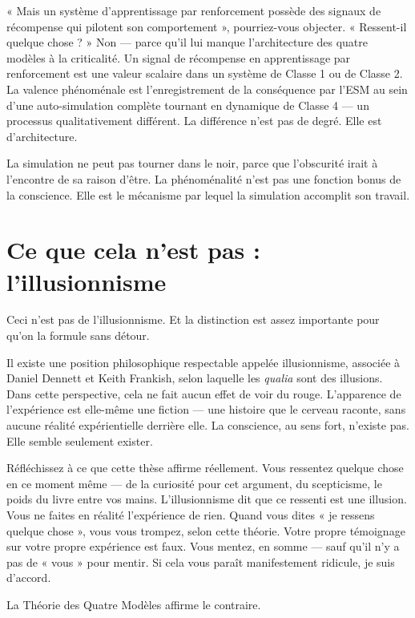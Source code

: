 \documentclass[11pt, twoside, openright]{book}
\begin{document}
« Mais un système d'apprentissage par renforcement possède des signaux de récompense qui pilotent son comportement », pourriez-vous objecter. « Ressent-il quelque chose ? » Non --- parce qu'il lui manque l'architecture des quatre modèles à la criticalité. Un signal de récompense en apprentissage par renforcement est une valeur scalaire dans un système de Classe 1 ou de Classe 2. La valence phénoménale est l'enregistrement de la conséquence par l'ESM au sein d'une auto-simulation complète tournant en dynamique de Classe 4 --- un processus qualitativement différent. La différence n'est pas de degré. Elle est d'architecture.

La simulation ne peut pas tourner dans le noir, parce que l'obscurité irait à l'encontre de sa raison d'être. La phénoménalité n'est pas une fonction bonus de la conscience. Elle est le mécanisme par lequel la simulation accomplit son travail.

\section*{Ce que cela n'est pas : l'illusionnisme}

Ceci n'est pas de l'illusionnisme. Et la distinction est assez importante pour qu'on la formule sans détour.

Il existe une position philosophique respectable appelée illusionnisme, associée à Daniel Dennett et Keith Frankish, selon laquelle les \textit{qualia} sont des illusions. Dans cette perspective, cela ne fait aucun effet de voir du rouge. L'apparence de l'expérience est elle-même une fiction --- une histoire que le cerveau raconte, sans aucune réalité expérientielle derrière elle. La conscience, au sens fort, n'existe pas. Elle semble seulement exister.

Réfléchissez à ce que cette thèse affirme réellement. Vous ressentez quelque chose en ce moment même --- de la curiosité pour cet argument, du scepticisme, le poids du livre entre vos mains. L'illusionnisme dit que ce ressenti est une illusion. Vous ne faites en réalité l'expérience de rien. Quand vous dites « je ressens quelque chose », vous vous trompez, selon cette théorie. Votre propre témoignage sur votre propre expérience est faux. Vous mentez, en somme --- sauf qu'il n'y a pas de « vous » pour mentir. Si cela vous paraît manifestement ridicule, je suis d'accord.

La Théorie des Quatre Modèles affirme le contraire.
\end{document}
